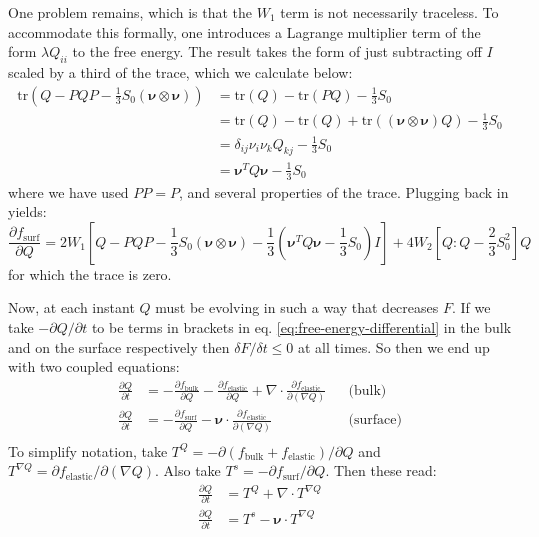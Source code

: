 \documentclass[reqno]{article}
\newcommand{\fb}{f_\text{bulk}}
\newcommand{\fe}{f_\text{elastic}}
\newcommand{\fs}{f_\text{surf}}
\newcommand{\tr}{\text{tr}}
\begin{document}
One problem remains, which is that the $W_1$ term is not necessarily traceless.
To accommodate this formally, one introduces a Lagrange multiplier term of the form $\lambda Q_{ii}$ to the free energy.
The result takes the form of just subtracting off $I$ scaled by a third of the trace, which we calculate below:
\begin{equation}
\begin{split}
    \tr \left(Q - PQP - \frac13 S_0 \left(\boldsymbol\nu \otimes \boldsymbol\nu\right) \right)
    &=
    \tr(Q) - \tr (PQ) - \frac13 S_0 \\
    &=
    \tr(Q) - \tr(Q) + \tr\left(\left(\boldsymbol\nu \otimes \boldsymbol\nu\right) Q \right) - \frac13 S_0 \\
    &=
    \delta_{ij} \nu_i \nu_k Q_{kj} - \frac13 S_0 \\
    &= \boldsymbol\nu^T Q \boldsymbol\nu - \frac13 S_0
\end{split}
\end{equation}
where we have used $PP = P$, and several properties of the trace.
Plugging back in yields:
\begin{equation}
    \frac{\partial \fs}{\partial Q}
    =
    2 W_1 \left[ 
        Q - PQP - \frac13 S_0 \left( \boldsymbol\nu \otimes \boldsymbol\nu \right)
        - \frac13 \left(\boldsymbol\nu^T Q \boldsymbol\nu - \frac13 S_0\right) I
    \right]
    + 4 W_2 \left[ Q : Q - \frac23 S_0^2 \right] Q
\end{equation}
for which the trace is zero.

Now, at each instant $Q$ must be evolving in such a way that decreases $F$. 
If we take $-\partial Q / \partial t$ to be terms in brackets in eq. \eqref{eq:free-energy-differential} in the bulk and on the surface respectively then $\delta F / \delta t \leq 0$ at all times.
So then we end up with two coupled equations:
\begin{align}
    \frac{\partial Q}{\partial t}
    &=
    -\frac{\partial \fb}{\partial Q}
    - \frac{\partial \fe}{\partial Q}
    + \nabla \cdot \frac{\partial \fe}{\partial \left(\nabla Q\right)} &&\text{(bulk)} \\
    \frac{\partial Q}{\partial t}
    &=
    -\frac{\partial \fs}{\partial Q}
    - \boldsymbol\nu \cdot \frac{\partial \fe}{\partial \left(\nabla Q\right)} &&\text{(surface)} \\
\end{align}
To simplify notation, take $T^Q = -\partial (\fb + \fe) / \partial Q$ and $T^{\nabla Q} = \partial \fe / \partial (\nabla Q)$.
Also take $T^s = -\partial \fs / \partial Q$.
Then these read:
\begin{align}
    \frac{\partial Q}{\partial t} \label{eq:Q-bulk-evolution}
    &=
    T^Q
    + \nabla \cdot T^{\nabla Q} \\
    \frac{\partial Q}{\partial t} \label{eq:Q-surf-evolution}
    &=
    T^s
    - \boldsymbol\nu \cdot T^{\nabla Q}
\end{align}
\end{document}
